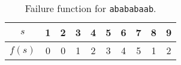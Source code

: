\begin{table}[!ht]
    \centering
    \begin{tabular}{|c||c|c|c|c|c|c|c|c|c|}
        \hline
        $s$ & 1 & 2 & 3 & 4 & 5 & 6 & 7 & 8 & 9 \\
        \hline
        $f(s)$ & 0 & 0 & 1 & 2 & 3 & 4 & 5 & 1 & 2 \\
        \hline
    \end{tabular}
    \caption{Failure function for \texttt{abababaab}.}
    \label{tab:030403a}
\end{table}